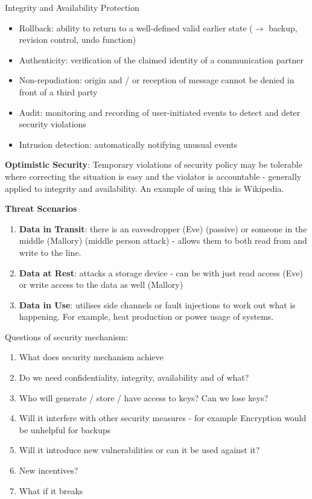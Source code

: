\documentclass{article}
\newenvironment{definition}{\par\color{blue}}{\par}
\begin{document}
\begin{enumerate}
	\bigskip
	Integrity and Availability Protection
	\begin{itemize}
		\item Rollback: ability to return to a well-defined valid earlier state ($\rightarrow$ backup, revision control, undo function)
		\item Authenticity: verification of the claimed identity of a communication partner
		\item Non-repudiation: origin and / or reception of message cannot be denied in front of a third party
		\item Audit: monitoring and recording of user-initiated events to detect and deter security violations
		\item Intrusion detection: automatically notifying unusual events
	\end{itemize}

	\begin{definition}
		\textbf{Optimistic Security}: Temporary violations of security policy may be tolerable where correcting the situation is easy and the violator is accountable - generally applied to integrity and availability. An example of using this is Wikipedia.
	\end{definition}
\end{enumerate}

\noindent
\textbf{Threat Scenarios}
\begin{enumerate}
	\item \textbf{Data in Transit}: there is an eavesdropper (Eve) (passive) or someone in the middle (Mallory) (middle person attack) - allows them to both read from and write to the line.
	
	\item \textbf{Data at Rest}: attacks a storage device - can be with just read access (Eve) or write access to the data as well (Mallory)
	
	\item \textbf{Data in Use}: utilises side channels or fault injections to work out what is happening. For example, heat production or power usage of systems.
\end{enumerate}

Questions of security mechanism:
\begin{enumerate}
	\item What does security mechanism achieve
	\item Do we need confidentiality, integrity, availability and of what?
	\item Who will generate / store / have access to keys? Can we lose keys?
	\item Will it interfere with other security measures - for example Encryption would be unhelpful for backups
	\item Will it introduce new vulnerabilities or can it be used against it?
	\item New incentives?
	\item What if it breaks
\end{enumerate}
\end{document}
